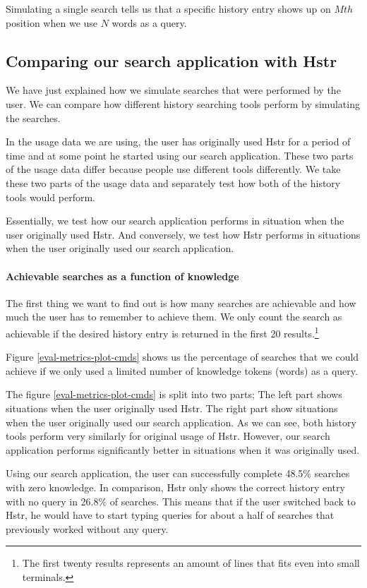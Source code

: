 Simulating a single search tells us that a specific history entry shows up on \(Mth\) position when we use \(N\) words as a query.


\subsection{Comparing our search application with Hstr}

We have just explained how we simulate searches that were performed by the user. We can compare how different history searching tools perform by simulating the searches. 

In the usage data we are using, the user has originally used Hstr for a period of time and at some point he started using our search application. These two parts of the usage data differ because people use different tools differently. We take these two parts of the usage data and separately test how both of the history tools would perform. 

Essentially, we test how our search application performs in situation when the user originally used Hstr. And conversely, we test how Hstr performs in situations when the user originally used our search application.

\paragraph{Achievable searches as a function of knowledge}

The first thing we want to find out is how many searches are achievable and how much the user has to remember to achieve them. We only count the search as achievable if the desired history entry is returned in the first 20 results.\footnote{The first twenty results represents an amount of lines that fits even into small terminals.} 

Figure \ref{eval-metrics-plot-cmds} shows us the percentage of searches that we could achieve if we only used a limited number of knowledge tokens (words) as a query. 

The figure \ref{eval-metrics-plot-cmds} is split into two parts; The left part shows situations when the user originally used Hstr. The right part show situations when the user originally used our search application. As we can see, both history tools perform very similarly for original usage of Hstr. However, our search application performs significantly better in situations when it was originally used. 

Using our search application, the user can successfully complete 48.5\% searches with zero knowledge. In comparison, Hstr only shows the correct history entry with no query in 26.8\% of searches. 
This means that if the user switched back to Hstr, he would have to start typing queries for about a half of searches that previously worked without any query.


